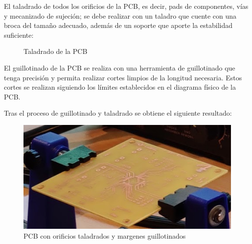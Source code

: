 \begin{itemize}
   El taladrado de todos los orificios de la \ac{PCB}, es decir, pads de componentes, vías y mecanizado de sujeción; se debe realizar con un taladro que cuente con una broca del tamaño adecuado, además de un soporte que aporte la estabilidad suficiente:
   
    \begin{figure}[H]
    \centering
    \caption{Taladrado de la \ac{PCB}}
    \label{fig:lego}
    \end{figure}
   
   El guillotinado de la \ac{PCB} se realiza con una herramienta de guillotinado que tenga precisión y permita realizar cortes limpios de la longitud necesaria. Estos cortes se realizan siguiendo los límites establecidos en el diagrama físico de la \ac{PCB}.
   
   Tras el proceso de guillotinado y taladrado se obtiene el siguiente resultado:
   
    \begin{figure}[H]
    \centering 
    \includegraphics[width=0.5\linewidth]{pictures/PCBTaladrada.PNG}
    \caption{\ac{PCB} con orificios taladrados y margenes guillotinados}
    \label{fig:kdiagram}
    \end{figure}
    

\end{itemize}
